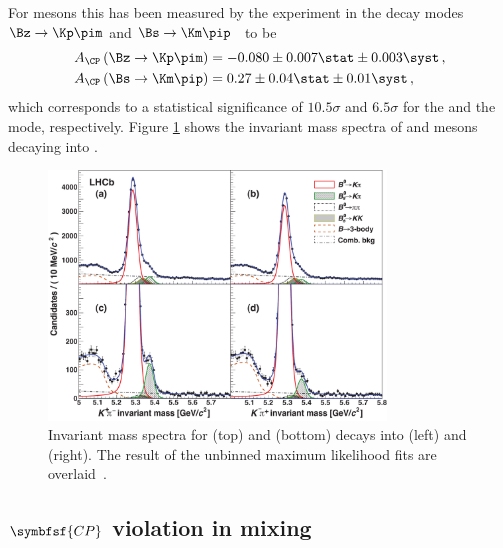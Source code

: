 For \B mesons this has been measured by the \lhcb experiment in the decay modes $\Bz\to\Kp\pim$ and $\Bs\to\Km\pip$~\cite{LHCb-PAPER-2013-018} to be
\begin{equation}
\begin{split}
A_{\CP}\left(\Bz\to\Kp\pim\right) &= -0.080\pm0.007\stat \pm 0.003\syst\,,\\
A_{\CP}\left(\Bs\to\Km\pip\right) &= 0.27\pm0.04\stat \pm 0.01\syst\,,
\end{split}
\end{equation}
which corresponds to a statistical significance of $10.5\sigma$ and $6.5\sigma$ for the \Bz and the \Bs mode, respectively.
Figure \ref{fig:DirectCPV} shows the invariant mass spectra of \Bz and \Bs mesons decaying into \Kp\pim.
\begin{figure}[tbp]
	\centering
	\includegraphics[width=0.8\textwidth]{03CPV/figs/DirectCPV.pdf}
	\caption{Invariant mass spectra for \Bz (top) and \Bs (bottom) decays into \Kp\pim (left) and \Km\pip(right). The result of the unbinned maximum likelihood fits are overlaid~\cite{LHCb-PAPER-2013-018}.}
	\label{fig:DirectCPV}
\end{figure}

\subsection[head={\CP violation in mixing},tocentry={\CP violation in mixing}]{$\symbfsf{C{}P}$ violation in mixing}
\label{sec:MixingCPV}

